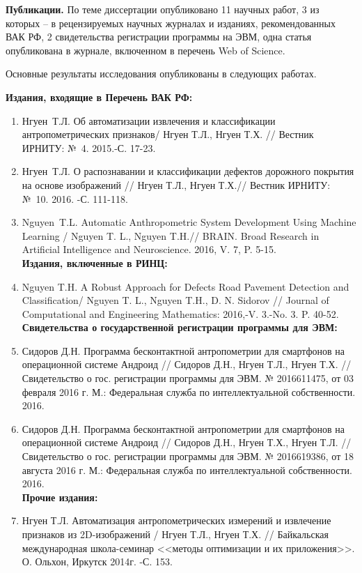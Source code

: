 \textbf{Публикации.} По теме диссертации опубликовано 11 научных работ, 3 из которых – в рецензируемых научных журналах и изданиях, рекомендованных ВАК РФ, 2 свидетельства регистрации программы на ЭВМ, одна статья опубликована в журнале, включенном в перечень Web of Science.

Основные результаты исследования опубликованы в следующих работах.

\textbf{Издания, входящие в Перечень ВАК РФ:}

\begin{enumerate}
	\item Нгуен~Т.Л. Об автоматизации извлечения и классификации антропометрических признаков/ Нгуен Т.Л., Нгуен Т.Х. // Вестник ИРНИТУ: №~4. 2015.-С. 17-23.
	\item Нгуен~Т.Л. О распознавании и классификации дефектов дорожного покрытия на основе изображений // Нгуен Т.Л., Нгуен Т.Х.// Вестник ИРНИТУ: №~10. 2016. -С. 111-118.
	\item Nguyen~T.L. Automatic Anthropometric System Development Using Machine Learning / Nguyen T. L., Nguyen T.H.// BRAIN. Broad Research in Artificial Intelligence and Neuroscience. 2016, V. 7, P. 5-15.\\
	\textbf{Издания, включенные в РИНЦ:}
	\item Nguyen T.H. A Robust Approach for Defects Road Pavement Detection and Classification/ Nguyen T. L., Nguyen T.H., D. N. Sidorov // Journal of Computational and Engineering Mathematics: 2016,-V. 3.-No. 3. P. 40-52.\\
	\textbf{Свидетельства о государственной регистрации программы для ЭВМ:}
	\item  Сидоров Д.Н. Программа бесконтактной антропометрии для смартфонов на операционной системе Андроид // Сидоров Д.Н., Нгуен Т.Л., Нгуен Т.Х. // Свидетельство о гос. регистрации программы для ЭВМ. № 2016611475, от 03 февраля 2016 г. М.: Федеральная служба по интеллектуальной собственности. 2016.
	\item  Сидоров Д.Н. Программа бесконтактной антропометрии для смартфонов на операционной системе Андроид // Сидоров Д.Н.,  Нгуен Т.Х., Нгуен Т.Л. // Свидетельство о гос. регистрации программы для ЭВМ. № 2016619386, от 18 августа  2016 г. М.: Федеральная служба по интеллектуальной собственности. 2016.\\
\textbf{Прочие издания:}
\item  Нгуен Т.Л. Автоматизация антропометрических измерений и извлечение признаков из 2D-изображений / Нгуен Т.Л., Нгуен Т.Х. // Байкальская международная школа-семинар <<методы оптимизации и их приложения>>. О. Ольхон, Иркутск 2014г. -С. 153.

\end{enumerate}
